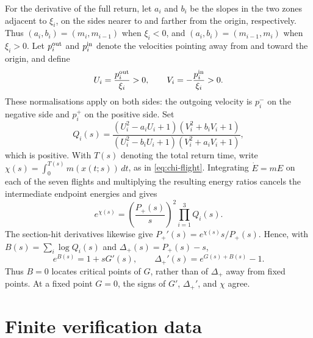 \documentclass[11pt]{article}
\theoremstyle{remark}
\begin{document}
For the derivative of the full return, let \(a_i\) and \(b_i\) be the
slopes in the two zones adjacent to \(\xi_i\), on the sides nearer to
and farther from the origin, respectively.
Thus \((a_i,b_i)=(m_i,m_{i-1})\) when \(\xi_i<0\), and
\((a_i,b_i)=(m_{i-1},m_i)\) when \(\xi_i>0\).  Let
\(p_i^{\rm out}\) and \(p_i^{\rm in}\) denote the velocities pointing
away from and toward the origin, and define
\[
 U_i=\frac{p_i^{\rm out}}{\xi_i}>0,
 \qquad V_i=-\frac{p_i^{\rm in}}{\xi_i}>0.
\]
These normalisations apply on both sides: the outgoing velocity is
\(p_i^-\) on the negative side and \(p_i^+\) on the positive side.
Set
\begin{equation}\label{eq:energy-ratio-appendix}
 Q_i(s)=\frac{(U_i^2-a_iU_i+1)(V_i^2+b_iV_i+1)}
 {(U_i^2-b_iU_i+1)(V_i^2+a_iV_i+1)},
\end{equation}
which is positive.  With \(T(s)\) denoting the total return time, write
\(\chi(s)=\int_0^{T(s)}m(x(t;s))\,dt\), as in
\eqref{eq:chi-flight}.  Integrating \(\dot E=mE\) on each of the
seven flights and multiplying the resulting energy ratios cancels the
intermediate endpoint energies and gives
\begin{equation}\label{eq:energy-product-appendix}
 e^{\chi(s)}=\left(\frac{P_+(s)}s\right)^2\prod_{i=1}^3Q_i(s).
\end{equation}
The section-hit derivatives likewise give
\(P_+'(s)=e^{\chi(s)}s/P_+(s)\).  Hence, with
\(B(s)=\sum_i\log Q_i(s)\) and \(\Delta_+(s)=P_+(s)-s\),
\begin{equation}\label{eq:distortion-appendix}
 e^{B(s)}=1+sG'(s),\qquad
 \Delta_+'(s)=e^{G(s)+B(s)}-1.
\end{equation}
Thus \(B=0\) locates critical points of \(G\), rather than of
\(\Delta_+\) away from fixed points.  At a fixed point \(G=0\), the
signs of \(G'\), \(\Delta_+'\), and \(\chi\) agree.

\section{Finite verification data}\label{app:supplement}
\end{document}
